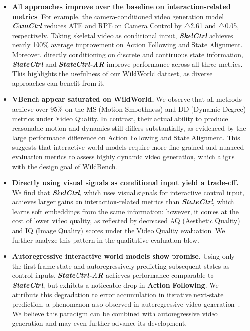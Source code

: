 \begin{itemize}
    \item \textbf{All approaches improve over the baseline on interaction-related metrics}.
    For example, the camera-conditioned video generation model \textit{\textbf{CamCtrl}} reduces ATE and RPE on Camera Control by $\triangle$2.61 and $\triangle$0.05, respectively. 
    Taking skeletal video as conditional input, \textit{\textbf{SkelCtrl}} achieves nearly 100\% average improvement on Action Following and State Alignment.
    Moreover, directly conditioning on discrete and continuous state information, \textit{\textbf{StateCtrl}} and \textit{\textbf{StateCtrl-AR}} improve performance across all three metrics.
    This highlights the usefulness of our WildWorld dataset, as diverse approaches can benefit from it.

    \item \textbf{VBench appear saturated on WildWorld.} We observe that all methods achieve over 95\% on the MS (Motion Smoothness) and DD (Dynamic Degree) metrics under Video Quality.
    In contrast, their actual ability to produce reasonable motion and dynamics still differs substantially, as evidenced by the large performance difference on Action Following and State Alignment.
    This suggests that interactive world models require more fine-grained and nuanced evaluation metrics to assess highly dynamic video generation, which aligns with the design goal of WildBench.
    
    \item \textbf{Directly using visual signals as conditional input yield a trade-off.}
    We find that \textit{\textbf{SkelCtrl}}, which uses visual signals for interactive control input, achieves larger gains on interaction-related metrics than \textit{\textbf{StateCtrl}}, which learns soft embeddings from the same information; however, it comes at the cost of lower video quality, as reflected by decreased AQ (Aesthetic Quality) and IQ (Image Quality) scores under the Video Quality evaluation. We further analyze this pattern in the qualitative evaluation blow.

    \item \textbf{Autoregressive interactive world models show promise}.
    Using only the first-frame state and autoregressively predicting subsequent states as control inputs, \textit{\textbf{StateCtrl-AR}} achieves performance comparable to \textit{\textbf{StateCtrl}}, but exhibits a noticeable drop in \textbf{Action Following}.
    We attribute this degradation to error accumulation in iterative next-state prediction, a phenomenon also observed in autoregressive video generation~\cite{huang2025self,longlive,ji2025memflow}.
    We believe this paradigm can be combined with autoregressive video generation and may even further advance its development.

\end{itemize}

